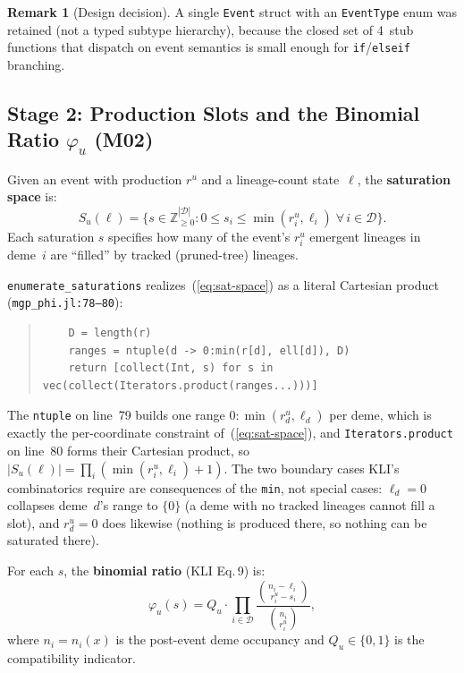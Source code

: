 \documentclass[11pt,leqno]{article}
\newcommand{\Demes}{\mathcal{D}}    %
\newcommand{\Zp}{\mathbb{Z}_{\ge 0}}
\newcommand{\code}[1]{\texttt{#1}}
\theoremstyle{plain}
\theoremstyle{definition}
\newtheorem{remark}[theorem]{Remark}
\begin{document}
\begin{remark}[Design decision]
A single \code{Event} struct with an \code{EventType} enum was retained
(not a typed subtype hierarchy), because the closed set of 4~stub functions
that dispatch on event semantics is small enough for \code{if}/\code{elseif}
branching.
\end{remark}

\subsection{Stage 2: Production Slots and the Binomial Ratio $\varphi_u$ (M02)}

Given an event with production $r^u$ and a lineage-count state~$\ell$,
the \textbf{saturation space} is:
\begin{equation}\label{eq:sat-space}
  S_u(\ell) = \bigl\{ s \in \Zp^{|\Demes|}
    : 0 \le s_i \le \min(r^u_i, \ell_i) \;\forall\, i \in \Demes \bigr\}.
\end{equation}
Each saturation $s$ specifies how many of the event's $r^u_i$ emergent
lineages in deme~$i$ are ``filled'' by tracked (pruned-tree) lineages.

\code{enumerate\_saturations} realizes~(\ref{eq:sat-space}) as a literal
Cartesian product (\code{mgp\_phi.jl:78--80}):
\begin{quote}
{\small
\begin{verbatim}
    D = length(r)
    ranges = ntuple(d -> 0:min(r[d], ell[d]), D)
    return [collect(Int, s) for s in vec(collect(Iterators.product(ranges...)))]
\end{verbatim}
}
\end{quote}
The \code{ntuple} on line~79 builds one range $0:\min(r^u_d,\ell_d)$ per deme,
which is exactly the per-coordinate constraint of~(\ref{eq:sat-space}), and
\code{Iterators.product} on line~80 forms their Cartesian product, so
$|S_u(\ell)| = \prod_{i}(\min(r^u_i,\ell_i)+1)$.  The two boundary cases KLI's
combinatorics require are consequences of the \code{min}, not special cases:
$\ell_d = 0$ collapses deme~$d$'s range to $\{0\}$ (a deme with no tracked
lineages cannot fill a slot), and $r^u_d = 0$ does likewise (nothing is
produced there, so nothing can be saturated there).

For each $s$, the \textbf{binomial ratio} (KLI Eq.\,9) is:
\begin{equation}\label{eq:phi}
  \varphi_u(s) = Q_u \cdot
  \prod_{i \in \Demes}
    \frac{\binom{n_i - \ell_i}{r^u_i - s_i}}{\binom{n_i}{r^u_i}},
\end{equation}
where $n_i = n_i(x)$ is the post-event deme occupancy and
$Q_u \in \{0,1\}$ is the compatibility indicator.
\end{document}
